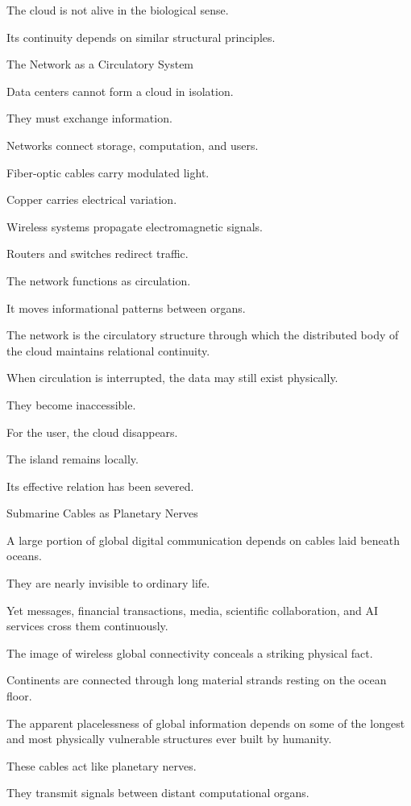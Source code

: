 The cloud is not alive in the biological sense.

Its continuity depends on similar structural principles.

The Network as a Circulatory System

Data centers cannot form a cloud in isolation.

They must exchange information.

Networks connect storage, computation, and users.

Fiber-optic cables carry modulated light.

Copper carries electrical variation.

Wireless systems propagate electromagnetic signals.

Routers and switches redirect traffic.

The network functions as circulation.

It moves informational patterns between organs.

The network is the circulatory structure through which the distributed body of the cloud maintains relational continuity.

When circulation is interrupted, the data may still exist physically.

They become inaccessible.

For the user, the cloud disappears.

The island remains locally.

Its effective relation has been severed.

Submarine Cables as Planetary Nerves

A large portion of global digital communication depends on cables laid beneath oceans.

They are nearly invisible to ordinary life.

Yet messages, financial transactions, media, scientific collaboration, and AI services cross them continuously.

The image of wireless global connectivity conceals a striking physical fact.

Continents are connected through long material strands resting on the ocean floor.

The apparent placelessness of global information depends on some of the longest and most physically vulnerable structures ever built by humanity.

These cables act like planetary nerves.

They transmit signals between distant computational organs.

